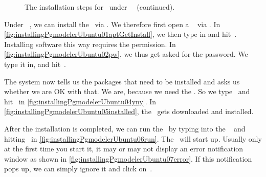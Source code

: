 \begin{figure}%
\ContinuedFloat%
\centering%
%
%
%
\floatRowSep%
%
%
%
\floatRowSep%
%
%
%
\floatSep%
%
%
%
\floatRowSep%
%
%
%
\caption{The installation steps for \pgmodeler\ under \ubuntu\ \linux~(continued).}%
\label{fig:installingPgmodelerUbuntu:C}%
\end{figure}%
%
Under \ubuntu\ \linux, we can install the \pgmodeler\ via .
We therefore first open a \bash\  via \ubuntuTerminal.
In \cref{fig:installingPgmodelerUbuntu01aptGetInstall}, we then type in  and hit~\keys{\return}.
Installing software this way requires the  permission.
In \cref{fig:installingPgmodelerUbuntu02pw}, we thus get asked for the  password.
We type it in, and hit~\keys{\return}.

The system now tells us the packages that need to be installed and asks us whether we are OK with that.
We are, because we need the \pgmodeler.
So we type~ and hit~\keys{\return} in \cref{fig:installingPgmodelerUbuntu04yny}.%
In \cref{fig:installingPgmodelerUbuntu05installed}, the \pgmodeler\ gets downloaded and installed.

After the installation is completed, we can run the \pgmodeler\ by typing  into the \bash\  and hitting~\keys{\return} in \cref{fig:installingPgmodelerUbuntu06run}.
The \pgmodeler\ will start up.
Usually only at the first time you start it, it may or may not display an error notification window as shown in \cref{fig:installingPgmodelerUbuntu07error}.
If this notification pops up, we can simply ignore it and click on~.

